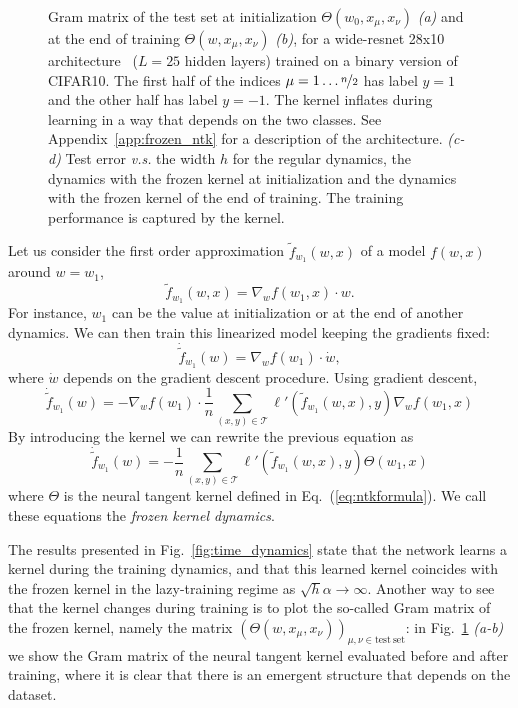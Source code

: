 \documentclass{article}
\newcommand{\be}{\begin{equation}}
\newcommand{\ee}{\end{equation}}
\renewcommand{\cite}[1]{\citep{#1}}
\newcommand{\mc}{\mathcal}
\newcommand{\mr}{\mathrm}
\newcommand{\eref}[1]{Eq.~(\ref{#1})}
\newcommand{\aref}[1]{Appendix~\ref{#1}}
\newcommand{\fref}[1]{Fig.~\ref{#1}}
\begin{document}
\begin{figure}[th]
    \centering
    \caption{Gram matrix of the test set at initialization $\Theta(w_0, x_\mu, x_\nu)$ \emph{(a)} and at the end of training $\Theta(w, x_\mu, x_\nu)$ \emph{(b)}, for a wide-resnet 28x10 architecture~\cite{Zagoruyko2016WRN} ($L=25$ hidden layers) trained on a binary version of CIFAR10. The first half of the indices $\mu = 1\dots\nicefrac{n}{2}$ has label $y=1$ and the other half has label $y=-1$. The kernel inflates during learning in a way that depends on the two classes. See \aref{app:frozen_ntk} for a description of the architecture. \emph{(c-d)} Test error \textit{v.s.} the width $h$ for the regular dynamics, the dynamics with the frozen kernel at initialization and the dynamics with the frozen kernel of the end of training. The training performance is captured by the kernel. \label{fig:kernel_dyn}}
\end{figure}

Let us consider the first order approximation $\tilde f_{w_1}(w, x)$ of a model $f(w, x)$ around $w = w_1$,
\be
\tilde f_{w_1}(w, x) = \nabla_w f(w_1, x) \cdot w.
\ee
For instance, $w_1$ can be the value at initialization or at the end of another dynamics. We can then train this linearized model keeping the gradients fixed:
\be
\dot{\tilde{f}}_{w_1}(w) = \nabla_w f(w_1) \cdot \dot w,
\ee
where $\dot w$ depends on the gradient descent procedure. Using gradient descent,
\be
    \dot{\tilde{f}}_{w_1}(w) = -\nabla_w f(w_1) \cdot \frac1n \sum_{(x,y) \in \mc T} \ell'(\tilde f_{w_1}(w, x), y) \nabla_w f(w_1, x)
\ee
By introducing the kernel we can rewrite the previous equation as
\be \label{eq:frozen_dyn}
    \dot{\tilde{f}}_{w_1}(w) = -\frac1n \sum_{(x,y) \in \mc T} \ell'(\tilde f_{w_1}(w, x), y) \Theta (w_1, x)
\ee
where $\Theta$ is the neural tangent kernel defined in \eref{eq:ntkformula}. We call these equations the \emph{frozen kernel dynamics}.

The results presented in \fref{fig:time_dynamics} state that the network learns a kernel during the training dynamics, and that this learned kernel coincides with the frozen kernel in the lazy-training regime as $\sqrt{h}\alpha\to\infty$. Another way to see that the kernel changes during training is to plot the so-called Gram matrix of the frozen kernel, namely the matrix $(\Theta(w,x_\mu,x_\nu))_{\mu,\nu\in\mr{test\ set}}$: in \fref{fig:kernel_dyn} \emph{(a-b)} we show the Gram matrix of the neural tangent kernel evaluated before and after training, where it is clear that there is an emergent structure that depends on the dataset. 
\end{document}
